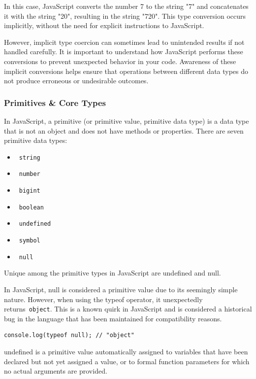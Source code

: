 In this case, JavaScript converts the number 7 to the string "7" and concatenates it with the string "20", resulting in the string "720". This type conversion occurs implicitly, without the need for explicit instructions to JavaScript.

However, implicit type coercion can sometimes lead to unintended results if not handled carefully. It is important to understand how JavaScript performs these conversions to prevent unexpected behavior in your code. Awareness of these implicit conversions helps ensure that operations between different data types do not produce erroneous or undesirable outcomes.

\subsubsection{Primitives \& Core Types}

In JavaScript, a primitive (or primitive value, primitive data type) is a data type that is not an object and does not have methods or properties. There are seven primitive data types:

\begin{itemize}
	\item ~\lstinline|string|
	\item ~\lstinline|number|
	\item ~\lstinline|bigint|
	\item ~\lstinline|boolean|
	\item ~\lstinline|undefined|
	\item ~\lstinline|symbol|
	\item ~\lstinline|null|
\end{itemize}

Unique among the primitive types in JavaScript are undefined and null.

In JavaScript, null is considered a primitive value due to its seemingly simple nature. However, when using the typeof operator, it unexpectedly returns~\lstinline|object|. This is a known quirk in JavaScript and is considered a historical bug in the language that has been maintained for compatibility reasons.

\begin{lstlisting}[caption=typeof null return "object" in JavaScript]
	console.log(typeof null); // "object"
\end{lstlisting}

undefined is a primitive value automatically assigned to variables that have been declared but not yet assigned a value, or to formal function parameters for which no actual arguments are provided.

